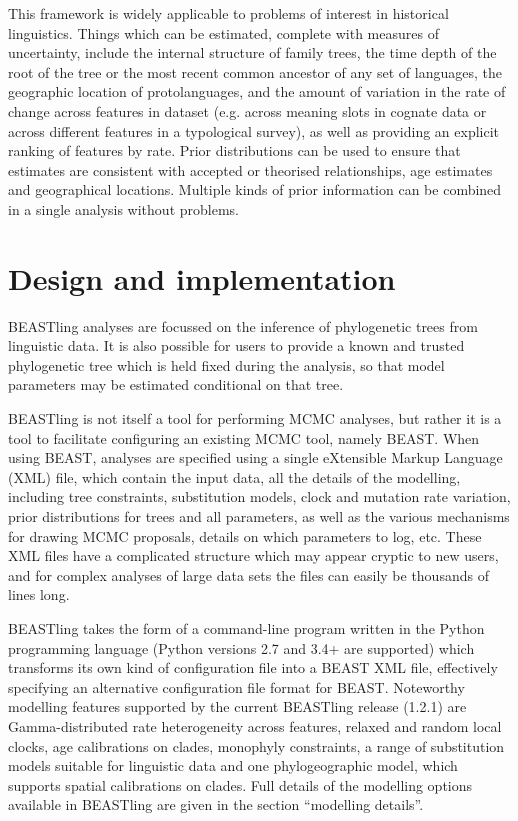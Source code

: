 \documentclass[10pt,a4paper]{article}
\begin{document}
This framework is widely applicable to problems of interest in historical linguistics.  Things which can be estimated, complete with measures of uncertainty, include the internal structure of family trees, the time depth of the root of the tree or the most recent common ancestor of any set of languages, the geographic location of protolanguages, and the amount of variation in the rate of change across features in dataset (e.g. across meaning slots in cognate data or across different features in a typological survey), as well as providing an explicit ranking of features by rate.  Prior distributions can be used to ensure that estimates are consistent with accepted or theorised relationships, age estimates and geographical locations.  Multiple kinds of prior information can be combined in a single analysis without problems.

\section{Design and implementation}

BEASTling analyses are focussed on the inference of phylogenetic trees from linguistic data.  It is also possible for users to provide a known and trusted phylogenetic tree which is held fixed during the analysis, so that model parameters may be estimated conditional on that tree.

BEASTling is not itself a tool for performing MCMC analyses, but rather it is a tool to facilitate configuring an existing MCMC tool, namely BEAST.  When using BEAST, analyses are specified using a single eXtensible Markup Language (XML) file, which contain the input data, all the details of the modelling, including tree constraints, substitution models, clock and mutation rate variation, prior distributions for trees and all parameters, as well as the various mechanisms for drawing MCMC proposals, details on which parameters to log, etc.  These XML files have a complicated structure which may appear cryptic to new users, and for complex analyses of large data sets the files can easily be thousands of lines long.

BEASTling takes the form of a command-line program written in the Python programming language (Python versions 2.7 and 3.4+ are supported) which transforms its own kind of configuration file into a BEAST XML file, effectively specifying an alternative configuration file format for BEAST. Noteworthy modelling features supported by the current BEASTling release (1.2.1) are Gamma-distributed rate heterogeneity across features, relaxed and random local clocks, age calibrations on clades, monophyly constraints, a range of substitution models suitable for linguistic data and one phylogeographic model, which supports spatial calibrations on clades.  Full details of the modelling options available in BEASTling are given in the section ``modelling details''.
\end{document}

